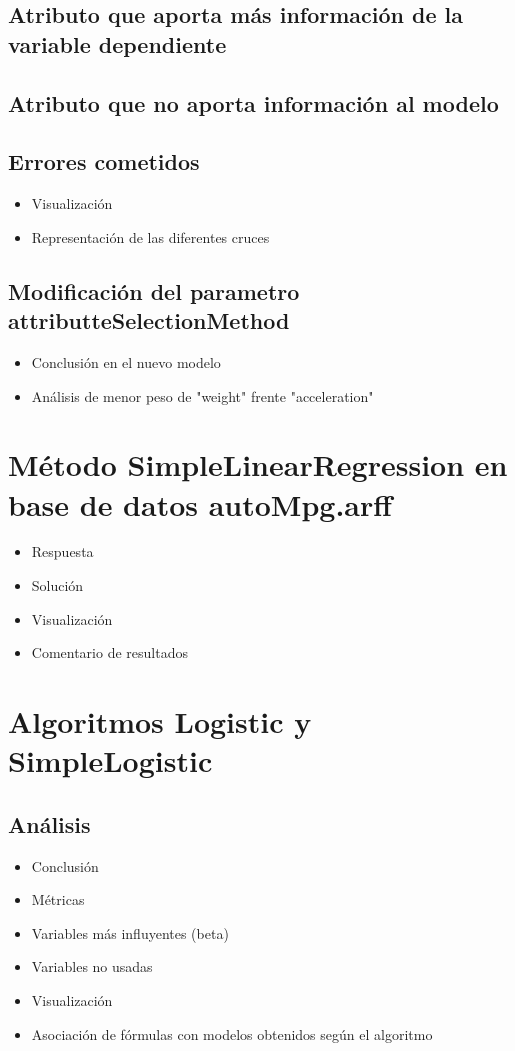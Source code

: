 	\subsection{Atributo que aporta más información de la variable dependiente}


	\subsection{Atributo que no aporta información al modelo}


	\subsection{Errores cometidos}
	\begin{itemize}
		\item Visualización
		\item Representación de las diferentes cruces
	\end{itemize}


	\subsection{Modificación del parametro attributteSelectionMethod}
	\begin{itemize}
		\item Conclusión en el nuevo modelo
		\item Análisis de menor peso de "weight" frente "acceleration"
	\end{itemize}

\newpage
\section{Método SimpleLinearRegression en base de datos autoMpg.arff}

	\begin{itemize}
		\item Respuesta
		\item Solución
		\item Visualización
		\item Comentario de resultados
	\end{itemize}

\newpage
\section{Algoritmos Logistic y SimpleLogistic}

	
	\subsection{Análisis}
		\begin{itemize}
			\item Conclusión
			\item Métricas
			\item Variables más influyentes (beta)
			\item Variables no usadas
			\item Visualización
			\item Asociación de fórmulas con modelos obtenidos según el algoritmo
		\end{itemize}

